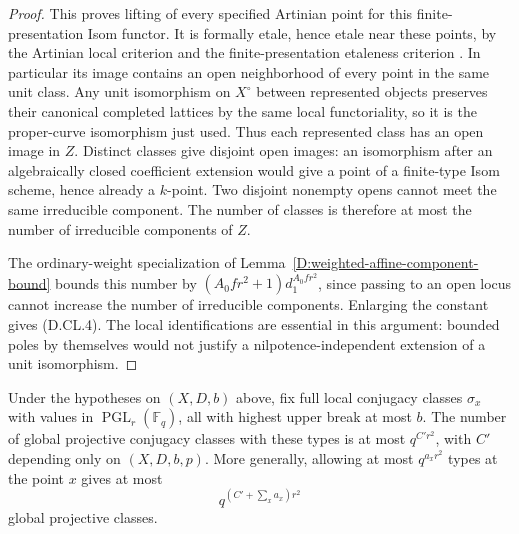 \begin{proof}
This proves lifting of every specified Artinian point for this
finite-presentation Isom functor. It is formally etale, hence
etale near these points, by the Artinian local criterion and the
finite-presentation etaleness criterion
\citep[Tags~02HT, 02HM and~00UR, complete written proofs]
{StacksUnitJetTransferD}. In particular its image contains an
open neighborhood of every point in the same unit class.
Any unit isomorphism on $X^\circ$ between represented objects
preserves their canonical completed lattices by the same local
functoriality, so it is the proper-curve isomorphism just used.
Thus each represented class has an open image in $Z$.
Distinct classes give disjoint open images: an isomorphism after
an algebraically closed coefficient extension would give a point
of a finite-type Isom scheme, hence already a $k$-point.
Two disjoint nonempty opens cannot meet the same irreducible
component. The number of classes is therefore at most the number
of irreducible components of $Z$.

The ordinary-weight specialization of
Lemma~\ref{D:weighted-affine-component-bound} bounds this number
by $(A_0fr^2+1)d_1^{A_0fr^2}$, since passing to an open locus
cannot increase the number of irreducible components. Enlarging
the constant gives (D.CL.4). The local identifications are essential
in this argument: bounded poles by themselves would not justify
a nilpotence-independent extension of a unit isomorphism.
\end{proof}

\begin{corollary}
\label{D:curve-fixed-local-projective-growth}
Under the hypotheses on $(X,D,b)$ above, fix full local conjugacy
classes $\sigma_x$ with values in $\operatorname{PGL}_r(\mathbb F_q)$,
all with highest upper break at most $b$. The number of global
projective conjugacy classes with these types is at most $q^{C'r^2}$,
with $C'$ depending only on $(X,D,b,p)$. More generally, allowing
at most $q^{a_xr^2}$ types at the point $x$ gives at most
\[
                            q^{(C'+\sum_x a_x)r^2}
 \tag{D.CL.10}
\]
global projective classes.
\end{corollary}

